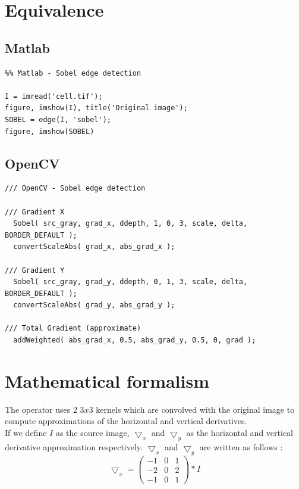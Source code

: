 \documentclass[12pt,a4paper]{article}
\begin{document}
\section*{Equivalence}
\subsection*{Matlab}

\lstset{language=Matlab}
\begin{lstlisting}
%% Matlab - Sobel edge detection

I = imread('cell.tif');
figure, imshow(I), title('Original image');
SOBEL = edge(I, 'sobel');
figure, imshow(SOBEL)

\end{lstlisting}


\subsection*{OpenCV}

\lstset{language=C++}
\begin{lstlisting}
/// OpenCV - Sobel edge detection

/// Gradient X
  Sobel( src_gray, grad_x, ddepth, 1, 0, 3, scale, delta, BORDER_DEFAULT );
  convertScaleAbs( grad_x, abs_grad_x );

/// Gradient Y
  Sobel( src_gray, grad_y, ddepth, 0, 1, 3, scale, delta, BORDER_DEFAULT );
  convertScaleAbs( grad_y, abs_grad_y );

/// Total Gradient (approximate)
  addWeighted( abs_grad_x, 0.5, abs_grad_y, 0.5, 0, grad );

\end{lstlisting}

\section*{Mathematical formalism}

The operator uses 2 $3x3$ kernels which are convolved with the original image to compute approximations of the horizontal and vertical derivatives. \\

If we define $I$ as the source image, $\bigtriangledown_x$ and $\bigtriangledown_y$ as the horizontal and vertical derivative approximation respectively. $\bigtriangledown_x$ and $\bigtriangledown_y$ are written as follows :\\

\begin{equation}\label{eq1}
\bigtriangledown_x = \begin{pmatrix}
-1 & 0 & 1 \\ 
-2 & 0 & 2 \\ 
-1 & 0 & 1
\end{pmatrix}*I
\end{equation}
\end{document}
